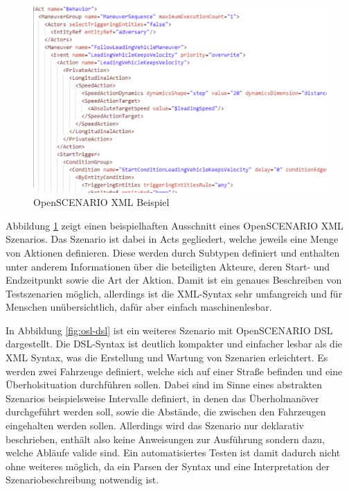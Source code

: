 \begin{figure}[h]
    \centering
    \includegraphics[width=0.85\linewidth]{contents/figures/openscenario_xml.png}
    \caption{OpenSCENARIO XML Beispiel \cite{EinfuehrungIntegrationsprojekt}}
    \label{fig:osl-xml}
\end{figure}

Abbildung \ref{fig:osl-xml} zeigt einen beispielhaften Ausschnitt eines OpenSCENARIO XML Szenarios.
Das Szenario ist dabei in \glqq Acts\grqq{} gegliedert, welche jeweils eine Menge von Aktionen definieren.
Diese werden durch Subtypen definiert und enthalten unter anderem Informationen über die beteiligten Akteure, deren Start- und Endzeitpunkt sowie die Art der Aktion.
Damit ist ein genaues Beschreiben von Testszenarien möglich, allerdings ist die XML-Syntax sehr umfangreich und für Menschen unübersichtlich, dafür aber einfach maschinenlesbar.



In Abbildung \ref{fig:osl-dsl} ist ein weiteres Szenario mit OpenSCENARIO DSL dargestellt.
Die DSL-Syntax ist deutlich kompakter und einfacher lesbar als die XML Syntax, was die Erstellung und Wartung von Szenarien erleichtert.
Es werden zwei Fahrzeuge definiert, welche sich auf einer Straße befinden und eine Überholsituation durchführen sollen.
Dabei sind im Sinne eines abstrakten Szenarios beispielsweise Intervalle definiert, in denen das Überholmanöver durchgeführt werden soll, sowie die Abstände, die zwischen den Fahrzeugen eingehalten werden sollen.
Allerdings wird das Szenario nur deklarativ beschrieben, enthält also keine Anweisungen zur Ausführung sondern dazu, welche Abläufe valide sind.
Ein automatisiertes Testen ist damit dadurch nicht ohne weiteres möglich, da ein Parsen der Syntax und eine Interpretation der Szenariobeschreibung notwendig ist. 


